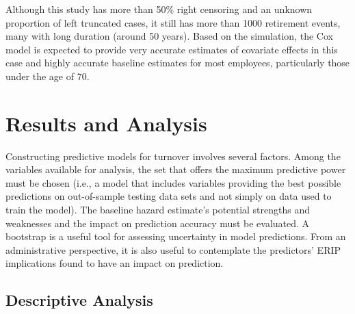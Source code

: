 Although this study has more than 50\% right censoring and an unknown proportion of left truncated cases, it still has more than 1000 retirement events, many with long duration (around 50 years). Based on the simulation, the Cox model is expected to provide very accurate estimates of covariate effects in this case and highly accurate baseline estimates for most employees, particularly those under the age of 70.

\section{Results and Analysis} \label{application}
Constructing predictive models for turnover involves several factors. Among the  variables available  for analysis,  the set  that offers  the maximum predictive power must be chosen (i.e., a model that includes variables providing the best possible predictions on out-of-sample testing data sets and not simply on data used to train the model). The baseline hazard estimate's potential strengths and weaknesses and the impact on prediction accuracy must be evaluated. A bootstrap is a useful tool for assessing uncertainty in model predictions. From an administrative perspective, it is also useful to contemplate the predictors' ERIP implications found to have an impact on prediction.

\subsection{Descriptive Analysis}


